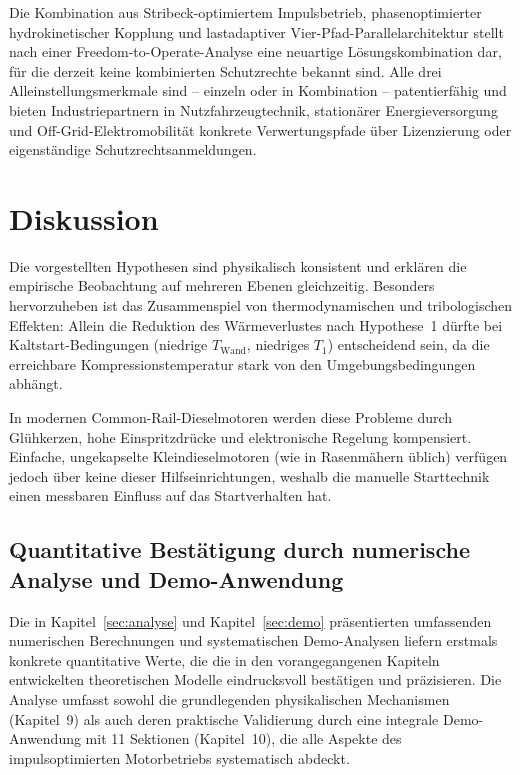 ﻿\documentclass[a4paper,12pt]{article}
\begin{document}
Die Kombination aus Stribeck-optimiertem Impulsbetrieb, phasenoptimierter
hydrokinetischer Kopplung und lastadaptiver Vier-Pfad-Parallelarchitektur
stellt nach einer Freedom-to-Operate-Analyse eine neuartige Lösungskombination
dar, für die derzeit keine kombinierten Schutzrechte bekannt sind. Alle drei
Alleinstellungsmerkmale sind -- einzeln oder in Kombination -- patentierfähig
und bieten Industriepartnern in Nutzfahrzeugtechnik, stationärer
Energieversorgung und Off-Grid-Elektromobilität konkrete Verwertungspfade
über Lizenzierung oder eigenständige Schutzrechtsanmeldungen.

\section{Diskussion}

Die vorgestellten Hypothesen sind physikalisch konsistent und erklären die
empirische Beobachtung auf mehreren Ebenen gleichzeitig. Besonders hervorzuheben
ist das Zusammenspiel von thermodynamischen und tribologischen Effekten: Allein die
Reduktion des Wärmeverlustes nach Hypothese~1 dürfte bei Kaltstart-Bedingungen
(niedrige $T_\text{Wand}$, niedriges $T_1$) entscheidend sein, da die erreichbare
Kompressionstemperatur stark von den Umgebungsbedingungen abhängt.

In modernen Common-Rail-Dieselmotoren werden diese Probleme durch Glühkerzen,
hohe Einspritzdrücke und elektronische Regelung kompensiert. Einfache,
ungekapselte Kleindieselmotoren (wie in Rasenmähern üblich) verfügen jedoch über
keine dieser Hilfseinrichtungen, weshalb die manuelle Starttechnik einen messbaren
Einfluss auf das Startverhalten hat.

\subsection{Quantitative Bestätigung durch numerische Analyse und Demo-Anwendung}

Die in Kapitel~\ref{sec:analyse} und Kapitel~\ref{sec:demo} präsentierten
umfassenden numerischen Berechnungen und systematischen Demo-Analysen
liefern erstmals konkrete quantitative Werte, die die in den vorangegangenen
Kapiteln entwickelten theoretischen Modelle eindrucksvoll bestätigen und
präzisieren. Die Analyse umfasst sowohl die grundlegenden physikalischen
Mechanismen (Kapitel~9) als auch deren praktische Validierung durch eine
integrale Demo-Anwendung mit 11 Sektionen (Kapitel~10), die alle Aspekte
des impulsoptimierten Motorbetriebs systematisch abdeckt.
\end{document}
